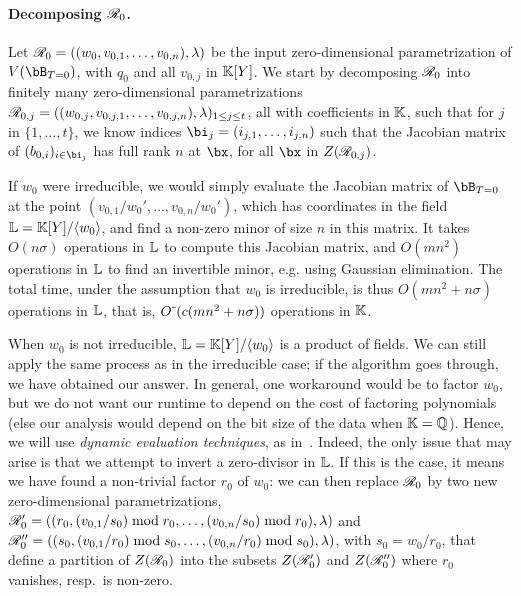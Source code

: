 \documentclass[12pt]{article}
\newtheorem{remark}[definition]{Remark}
\begin{document}

\paragraph{Decomposing $\mathscr{R}_0$.}
Let $\mathscr{R}_0 =((w_{0},v_{0,1},\dots,v_{0,n}),\lambda)$ be the input
zero-dimensional parametrization of $V(\bB_{T=0})$, with $q_0$ and all
$v_{0,j}$ in $\mathbb{K}[Y]$.  We start by decomposing $\mathscr{R}_0$ into
finitely many zero-dimensional parametrizations
$\mathscr{R}_{0,j}=((w_{0,j},v_{0,j,1},\dots,v_{0,j,n}),\lambda)_{1\le j\le
  t}$, all with coefficients in $\mathbb{K}$, such that for $j$ in
$\{1,\dots,t\}$, we know indices $\bi_j=(i_{j,1},\dots,i_{j,n})$ such that
the Jacobian matrix of $(b_{0,i})_{i \in \bi_j}$ has full rank $n$ at
$\bx$, for all $\bx$ in $Z(\mathscr{R}_{0,j})$.

If $w_0$ were irreducible, we would simply evaluate the Jacobian
matrix of $\bB_{T=0}$ at the point $(v_{0,1}/w_0',\dots,v_{0,n}/w_0')$,
which has coordinates in the field $\mathbb{L}=\mathbb{K}[Y]/\langle w_0 \rangle$,
and find a non-zero minor of size $n$ in this matrix. It takes
$O(n \sigma)$ operations in $\mathbb{L}$ to compute this Jacobian matrix, and
$O(mn^2)$ operations in $\mathbb{L}$ to find an invertible minor, e.g. using
Gaussian elimination. The total time, under the assumption that $w_0$
is irreducible, is thus $O(mn^2 + n\sigma)$ operations in $\mathbb{L}$, that is,
${O}{\,\tilde{ }\,}(c (mn^2 + n\sigma) )$ operations in $\mathbb{K}$.

When $w_0$ is not irreducible, $\mathbb{L}=\mathbb{K}[Y]/\langle w_0 \rangle$ is a
product of fields. We can still apply the same process as in the
irreducible case; if the algorithm goes through, we have obtained our
answer. In general, one workaround would be to factor $w_0$, but we do
not want our runtime to depend on the cost of factoring polynomials
(else our analysis would depend on the bit size of the data when
$\mathbb{K}=\mathbb{Q}$). Hence, we will use {\em dynamic evaluation
  techniques}, as in~\cite{D5}. Indeed, the only issue that may arise
is that we attempt to invert a zero-divisor in $\mathbb{L}$. If this is the case, it
means we have found a non-trivial factor $r_0$ of $w_0$: we can then
replace $\mathscr{R}_0$ by two new zero-dimensional parametrizations,
$\mathscr{R}'_0=((r_0,(v_{0,1}/s_0) \bmod r_0,\dots,(v_{0,n}/s_0)\bmod
r_0),\lambda)$
and
$\mathscr{R}''_0=((s_0,(v_{0,1}/r_0) \bmod s_0,\dots,(v_{0,n}/ r_0)\bmod
s_0),\lambda)$,
with $s_0=w_0/r_0$, that define a partition of $Z(\mathscr{R}_0)$ into the
subsets $Z(\mathscr{R}'_0)$ and $Z(\mathscr{R}''_0)$ where $r_0$ vanishes, resp.\
is non-zero.
\end{document}
